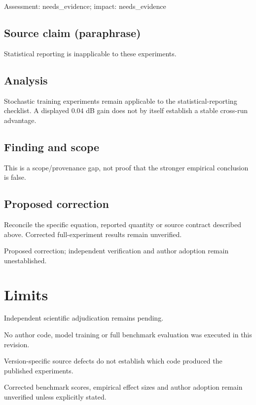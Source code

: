 \documentclass[11pt]{article}
\begin{document}
Assessment: needs\_evidence; impact: needs\_evidence

\subsection*{Source claim (paraphrase)}

Statistical reporting is inapplicable to these experiments.

\subsection*{Analysis}

Stochastic training experiments remain applicable to the statistical-reporting checklist. A displayed \(0.04\) dB gain does not by itself establish a stable cross-run advantage.

\subsection*{Finding and scope}

This is a scope/provenance gap, not proof that the stronger empirical conclusion is false.

\subsection*{Proposed correction}

Reconcile the specific equation, reported quantity or source contract described above. Corrected full-experiment results remain unverified.

Proposed correction; independent verification and author adoption remain unestablished.

\section*{Limits}

Independent scientific adjudication remains pending.\par

No author code, model training or full benchmark evaluation was executed in this revision.\par

Version-specific source defects do not establish which code produced the published experiments.\par

Corrected benchmark scores, empirical effect sizes and author adoption remain unverified unless explicitly stated.\par
\end{document}
